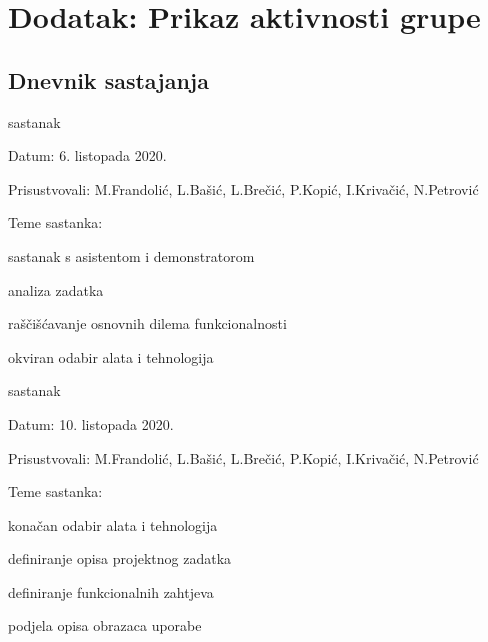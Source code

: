 \chapter*{Dodatak: Prikaz aktivnosti grupe}
		
		\section*{Dnevnik sastajanja}
		
		\begin{packed_enum}
			\item  sastanak
			
			\item[] \begin{packed_item}
				\item Datum: 6. listopada 2020.
				\item Prisustvovali: M.Frandolić, L.Bašić, L.Brečić, P.Kopić, I.Krivačić, N.Petrović
				\item Teme sastanka:
				\begin{packed_item}
					\item sastanak s asistentom i demonstratorom
					\item analiza zadatka
					\item raščišćavanje osnovnih dilema funkcionalnosti
					\item okviran odabir alata i tehnologija
				\end{packed_item}
			\end{packed_item}
		
			\item sastanak
			\item[] \begin{packed_item}
				\item Datum: 10. listopada 2020.
				\item Prisustvovali: M.Frandolić, L.Bašić, L.Brečić, P.Kopić, I.Krivačić, N.Petrović
				\item Teme sastanka:
				\begin{packed_item}
					\item konačan odabir alata i tehnologija
					\item definiranje opisa projektnog zadatka
					\item definiranje funkcionalnih zahtjeva
					\item podjela opisa obrazaca uporabe
				\end{packed_item}
			\end{packed_item}
			

\end{packed_enum}
